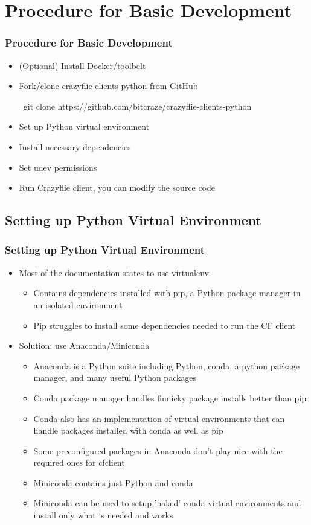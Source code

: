 \documentclass[t, xcolor=dvipsnames]{beamer} %
\begin{document}
\section{Procedure for Basic Development}
\begin{frame}
	\frametitle{Procedure for Basic Development}
	\begin{itemize}
		\item (Optional) Install Docker/toolbelt
		\item Fork/clone crazyflie-clients-python from GitHub
			\begin{semiverbatim}
			\ git clone https://github.com/bitcraze/crazyflie-clients-python
			\end{semiverbatim}
		\item Set up Python virtual environment
		\item Install necessary dependencies
		\item Set udev permissions
		\item Run Crazyflie client, you can modify the source code
	\end{itemize}
\end{frame}

\subsection{Setting up Python Virtual Environment}
\begin{frame}
	\frametitle{Setting up Python Virtual Environment}
	\begin{itemize}
		\item Most of the documentation states to use virtualenv
		\begin{itemize}
			\item Contains dependencies installed with pip, a Python package manager in an isolated environment
			\item Pip struggles to install some dependencies needed to run the CF client
		\end{itemize}
		\item Solution: use Anaconda/Miniconda
		\begin{itemize}
			\item Anaconda is a Python suite including Python, conda, a python package manager, and many useful Python packages	
			\item Conda package manager handles finnicky package installs better than pip
			\item Conda also has an implementation of virtual environments that can handle packages installed with conda as well as pip 
			\item Some preconfigured packages in Anaconda don't play nice with the required ones for cfclient
			\item Miniconda contains just Python and conda
			\item Miniconda can be used to setup 'naked' conda virtual environments and install only what is needed and works
		\end{itemize}
	\end{itemize}
\end{frame}
\end{document}
